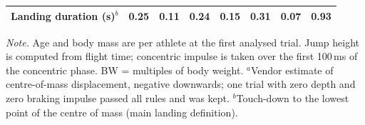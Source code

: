 \begin{table}[!htbp]
\begin{threeparttable}
\begin{tabular}{@{}l S[table-format=-4.2] S[table-format=3.2] S[table-format=-4.2] S[table-format=-3.2] S[table-format=-4.2] S[table-format=-3.2] S[table-format=-4.2]@{}}
\quad Landing duration (s)$^{b}$ & 0.25 & 0.11 & 0.24 & 0.15 & 0.31 & 0.07 & 0.93 \\
\bottomrule
\end{tabular}
\begin{tablenotes}[flushleft]\footnotesize
\item \textit{Note.} Age and body mass are per athlete at the first analysed trial. Jump height is computed from flight time; concentric impulse is taken over the first 100\,ms of the concentric phase. BW = multiples of body weight. $^{a}$Vendor estimate of centre-of-mass displacement, negative downwards; one trial with zero depth and zero braking impulse passed all rules and was kept. $^{b}$Touch-down to the lowest point of the centre of mass (main landing definition).
\end{tablenotes}
\end{threeparttable}
\end{table}
